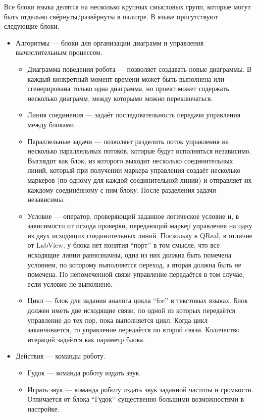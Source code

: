\documentclass[a4paper]{article}
\begin{document}
{Все блоки языка делятся на несколько крупных смысловых групп, которые могут быть отдельно свёрнуты/развёрнуты в палитре. В языке присутствуют следующие блоки.
\begin{itemize}
	\item Алгоритмы --- блоки для организации диаграмм и управления вычислительным процессом.
  \begin{itemize}
    \item Диаграмма поведения робота --- позволяет создавать новые диаграммы. В каждый конкретный момент времени может быть выполнена или сгенерирована только одна диаграмма, но проект может содержать несколько диаграмм, между которыми можно переключаться.
    \item Линия соединения --- задаёт последовательность передачи управления между блоками.
    \item Параллельные задачи --- позволяет разделить поток управления на несколько параллельных потоков, которые будут исполняться независимо. Выглядит как блок, из которого выходит несколько соединительных линий, который при получении маркера управления создаёт несколько маркеров (по одному для каждой соединительной линии) и отправляет их каждому соединённому с ним блоку. После разделения задачи независимы.
    \item Условие --- оператор, проверяющий заданное логическое условие и, в зависимости от исхода проверки, передающий маркер управления на одну из двух исходящих соединительных линий. Поскольку в QReal, в отличие от LabView, у блока нет понятия ``порт’’ в том смысле, что все исходящие линии равнозначны, одна из них должна быть помечена условием, по которому выполняется переход, а вторая должна быть не помечена. По непомеченной связи управление передаётся в том случае, если условие не выполнено.
    \item Цикл --- блок для задания аналога цикла ``for’’ в текстовых языках. Блок должен иметь две исходящие связи, по одной из которых передаётся управление до тех пор, пока выполняется цикл. Когда цикл заканчивается, то управление передаётся по второй связи. Количество итераций задаётся как параметр блока.
  \end{itemize}
  \item Действия --- команды роботу.
  \begin{itemize}
    \item Гудок --- команда роботу издать звук.
    \item Играть звук --- команда роботу издать звук заданной частоты и громкости. Отличается от блока ``Гудок’’ существенно большими возможностями в настройке.

\end{itemize}
\end{itemize}}
\end{document}
